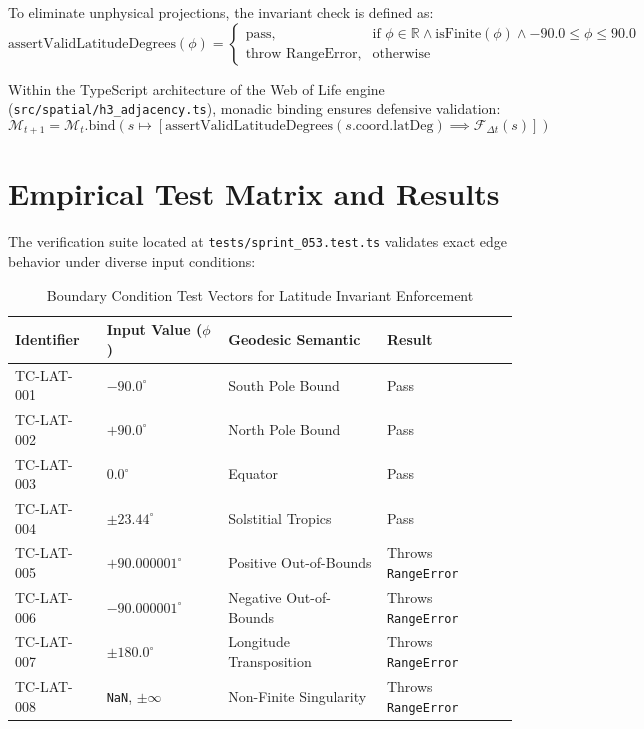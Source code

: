 \documentclass[11pt,a4paper]{article}
\begin{document}
To eliminate unphysical projections, the invariant check is defined as:
\begin{equation}
\text{assertValidLatitudeDegrees}(\phi) = 
\begin{cases}
\text{pass}, & \text{if } \phi \in \mathbb{R} \land \text{isFinite}(\phi) \land -90.0 \le \phi \le 90.0 \\
\text{throw } \text{RangeError}, & \text{otherwise}
\end{cases}
\end{equation}

Within the TypeScript architecture of the Web of Life engine (\texttt{src/spatial/h3\_adjacency.ts}), monadic binding ensures defensive validation:
\begin{equation}
\mathcal{M}_{t+1} = \mathcal{M}_t.\text{bind}\left(s \mapsto \left[ \text{assertValidLatitudeDegrees}(s.\text{coord}.\text{latDeg}) \implies \mathcal{F}_{\Delta t}(s) \right]\right)
\end{equation}

\section{Empirical Test Matrix and Results}

The verification suite located at \texttt{tests/sprint\_053.test.ts} validates exact edge behavior under diverse input conditions:

\begin{table}[htbp]
\centering
\caption{Boundary Condition Test Vectors for Latitude Invariant Enforcement}
\vspace{0.2cm}
\begin{tabular}{llll}
\toprule
\textbf{Identifier} & \textbf{Input Value ($\phi$)} & \textbf{Geodesic Semantic} & \textbf{Result} \\
\midrule
TC-LAT-001 & $-90.0^\circ$ & South Pole Bound & Pass \\
TC-LAT-002 & $+90.0^\circ$ & North Pole Bound & Pass \\
TC-LAT-003 & $0.0^\circ$ & Equator & Pass \\
TC-LAT-004 & $\pm 23.44^\circ$ & Solstitial Tropics & Pass \\
TC-LAT-005 & $+90.000001^\circ$ & Positive Out-of-Bounds & Throws \texttt{RangeError} \\
TC-LAT-006 & $-90.000001^\circ$ & Negative Out-of-Bounds & Throws \texttt{RangeError} \\
TC-LAT-007 & $\pm 180.0^\circ$ & Longitude Transposition & Throws \texttt{RangeError} \\
TC-LAT-008 & \texttt{NaN}, $\pm\infty$ & Non-Finite Singularity & Throws \texttt{RangeError} \\
\bottomrule
\end{tabular}
\end{table}
\end{document}
